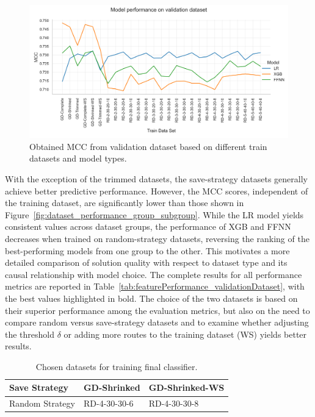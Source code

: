 \begin{figure}[ht]
    \centering
    \includegraphics[width =\textwidth]{pictures/feature_filter/validation_line_plot.png}
    \caption{Obtained MCC from validation dataset based on different train datasets and model types.}
    \label{fig:validation_performance_line_plot}
\end{figure}

With the exception of the trimmed datasets, the save-strategy datasets generally achieve better predictive performance.
However, the MCC scores, independent of the training dataset, are significantly lower than those shown in
Figure~\ref{fig:dataset_performance_group_subgroup}. While the LR model yields consistent values across dataset groups,
the performance of XGB and FFNN decreases when trained on random-strategy datasets, reversing the ranking of the best-performing
models from one group to the other. This motivates a more detailed comparison of solution quality with respect to dataset type and
its causal relationship with model choice. The complete results for all performance metrics are reported in Table~\ref{tab:featurePerformance_validationDataset},
with the best values highlighted in bold. The choice of the two datasets is based on their superior performance among the evaluation metrics,
but also on the need to compare random versus save-strategy datasets and to examine whether adjusting the threshold $\delta$ or adding
more routes to the training dataset (WS) yields better results.

\begin{table}[ht]
    \centering
    \setlength{\tabcolsep}{0.75em}
    \def\arraystretch{1.5}
    \begin{tabular}{l|ll}
        Save Strategy   & GD-Shrinked  & GD-Shrinked-WS \\\hline
        Random Strategy & RD-4-30-30-6 & RD-4-30-30-8   \\
    \end{tabular}
    \caption{Chosen datasets for training final classifier.}
    \label{tab:chosen_datasets}
\end{table}

